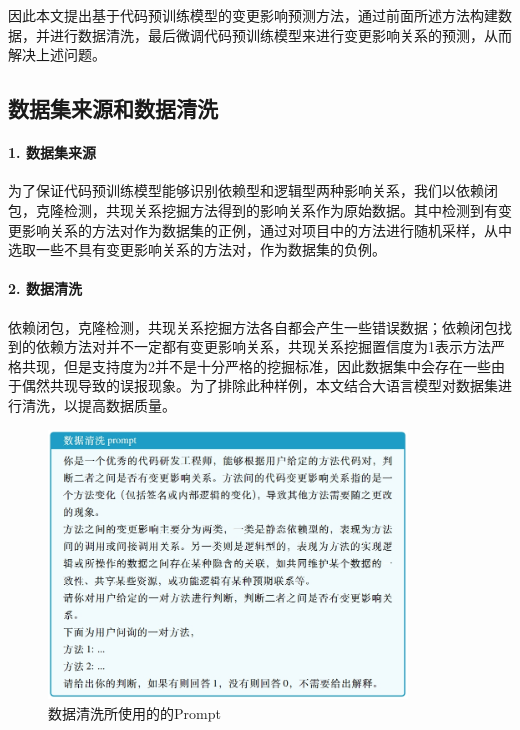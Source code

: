 因此本文提出基于代码预训练模型的变更影响预测方法，通过前面所述方法构建数据，并进行数据清洗，最后微调代码预训练模型来进行变更影响关系的预测，从而解决上述问题。

\subsection{数据集来源和数据清洗}
\label{1_数据集来源和数据清洗}
\paragraph{1. 数据集来源}

为了保证代码预训练模型能够识别依赖型和逻辑型两种影响关系，我们以依赖闭包，克隆检测，共现关系挖掘方法得到的影响关系作为原始数据。其中检测到有变更影响关系的方法对作为数据集的正例，通过对项目中的方法进行随机采样，从中选取一些不具有变更影响关系的方法对，作为数据集的负例。

\paragraph{2. 数据清洗}

依赖闭包，克隆检测，共现关系挖掘方法各自都会产生一些错误数据；依赖闭包找到的依赖方法对并不一定都有变更影响关系，共现关系挖掘置信度为1表示方法严格共现，但是支持度为2并不是十分严格的挖掘标准，因此数据集中会存在一些由于偶然共现导致的误报现象。为了排除此种样例，本文结合大语言模型对数据集进行清洗，以提高数据质量。


\begin{figure}[htbp]
\centering
\includegraphics[width = 0.85\textwidth]{figures/1_数据清洗.png}
\caption{数据清洗所使用的的Prompt}
\label{1_数据清洗}
\end{figure}


